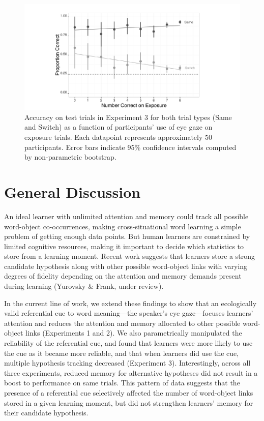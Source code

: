 \documentclass[12pt,]{article}
\begin{document}
\begin{figure}[htbp]
\centering
\includegraphics{figs/test accuracy expt 3-1.pdf}
\caption{Accuracy on test trials in Experiment 3 for both trial types
(Same and Switch) as a function of participants' use of eye gaze on
exposure trials. Each datapoint represents approximately 50
participants. Error bars indicate 95\% confidence intervals computed by
non-parametric bootstrap.}
\end{figure}

\section{General Discussion}\label{general-discussion}

An ideal learner with unlimited attention and memory could track all
possible word-object co-occurrences, making cross-situational word
learning a simple problem of getting enough data points. But human
learners are constrained by limited cognitive resources, making it
important to decide which statistics to store from a learning moment.
Recent work suggests that learners store a strong candidate hypothesis
along with other possible word-object links with varying degrees of
fidelity depending on the attention and memory demands present during
learning (Yurovsky \& Frank, under review).

In the current line of work, we extend these findings to show that an
ecologically valid referential cue to word meaning---the speaker's eye
gaze---focuses learners' attention and reduces the attention and memory
allocated to other possible word-object links (Experiments 1 and 2). We
also parametrically manipulated the reliability of the referential cue,
and found that learners were more likely to use the cue as it became
more reliable, and that when learners did use the cue, multiple
hypothesis tracking decreased (Experiment 3). Interestingly, across all
three experiments, reduced memory for alternative hypotheses did not
result in a boost to performance on same trials. This pattern of data
suggests that the presence of a referential cue selectively affected the
number of word-object links stored in a given learning moment, but did
not strengthen learners' memory for their candidate hypothesis.
\end{document}
